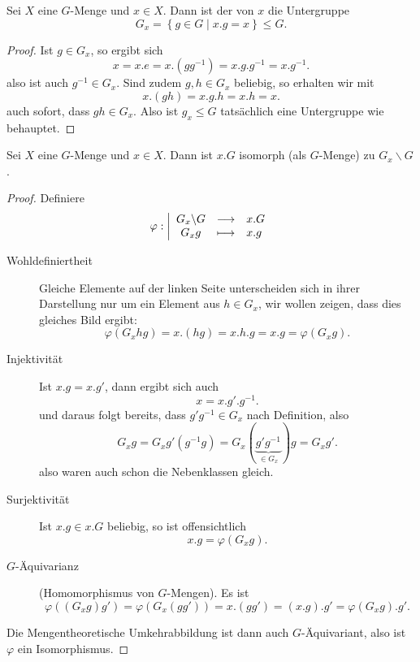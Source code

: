 \begin{dlemmadef}[Stabilisator]\label{def:stabilisator}
    Sei $X$ eine  $G$-Menge und  $x\in X$. Dann ist der  von $x$ die Untergruppe
    \[
    G_x = \left \{g\in G \mid  x.g = x\right\}\leq  G
    .\] 
\end{dlemmadef}
\begin{proof}
    Ist $g\in G_x$, so ergibt sich
    \[
        x = x.e = x.(gg^{-1}) = x.g.g^{-1} = x.g^{-1}
    .\] 
    also ist auch $g^{-1}\in G_x$. Sind zudem $g,h\in G_x$ beliebig, so erhalten wir mit
    \[
        x.(gh) = x.g.h = x.h = x
    .\] 
    auch sofort, dass $gh \in G_x$. Also ist $g_x \leq  G$ tatsächlich eine Untergruppe wie behauptet.
\end{proof}

\begin{lemma}
    Sei $X$ eine  $G$-Menge und  $x\in X$. Dann ist $x.G$ isomorph (als  $G$-Menge) zu  $G_x \backslash G$.
\end{lemma}
\begin{proof}
    Definiere
        \begin{equation*}
        \varphi : \left| \begin{array}{c c l} 
        G_x \backslash G & \longrightarrow & x.G \\
        G_xg & \longmapsto &  x.g
        \end{array} \right.
    \end{equation*}
    \begin{description}
        \item[Wohldefiniertheit] Gleiche Elemente auf der linken Seite unterscheiden sich in ihrer Darstellung nur um ein Element aus $h\in G_x$, wir wollen zeigen, dass dies gleiches Bild ergibt:
            \[
                \varphi (G_xhg) = x.(hg) = x.h.g = x.g = \varphi (G_xg)
            .\] 
        \item[Injektivität] Ist $x.g = x.g'$, dann ergibt sich auch
             \[
            x = x.g'.g^{-1}
            .\] 
            und daraus folgt bereits, dass $g'g^{-1} \in G_x$ nach Definition, also
            \[
                G_xg = G_xg'(g^{-1}g) = G_x(\underbrace{g'g^{-1}}_{\in G_x})g = G_xg'
            .\] 
            also waren auch schon die Nebenklassen gleich.
        \item[Surjektivität] Ist $x.g\in x.G$ beliebig, so ist offensichtlich
            \[
                x.g = \varphi (G_xg)
            .\] 
        \item[$G$-Äquivarianz] (Homomorphismus von $G$-Mengen). Es ist
             \[
                 \varphi ((G_xg)g') = \varphi (G_x(gg')) = x.(gg') = (x.g).g' = \varphi (G_xg).g'
            .\] 
    \end{description}
    Die Mengentheoretische Umkehrabbildung ist dann auch $G$-Äquivariant, also ist  $\varphi $ ein Isomorphismus.
\end{proof}

